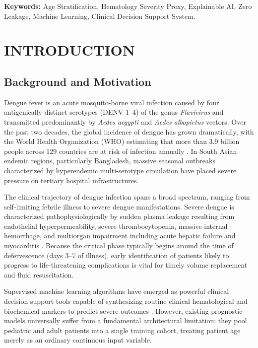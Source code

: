\documentclass[12pt, a4paper]{report}
\begin{document}
\vspace{0.8cm}
\noindent
\textbf{Keywords:} Age Stratification, Hematology Severity Proxy, Explainable AI, Zero Leakage, Machine Learning, Clinical Decision Support System.

\tableofcontents
\listoffigures
\listoftables

\clearpage
{}

\chapter{INTRODUCTION}

\section{Background and Motivation}
Dengue fever is an acute mosquito-borne viral infection caused by four antigenically distinct serotypes (DENV 1--4) of the genus \textit{Flavivirus} and transmitted predominantly by \textit{Aedes aegypti} and \textit{Aedes albopictus} vectors. Over the past two decades, the global incidence of dengue has grown dramatically, with the World Health Organization (WHO) estimating that more than 3.9 billion people across 129 countries are at risk of infection annually \cite{who2009, halstead2007}. In South Asian endemic regions, particularly Bangladesh, massive seasonal outbreaks characterized by hyperendemic multi-serotype circulation have placed severe pressure on tertiary hospital infrastructures.

The clinical trajectory of dengue infection spans a broad spectrum, ranging from self-limiting febrile illness to severe dengue manifestations. Severe dengue is characterized pathophysiologically by sudden plasma leakage resulting from endothelial hyperpermeability, severe thrombocytopenia, massive internal hemorrhage, and multiorgan impairment including acute hepatic failure and myocarditis \cite{who2009}. Because the critical phase typically begins around the time of defervescence (days 3--7 of illness), early identification of patients likely to progress to life-threatening complications is vital for timely volume replacement and fluid resuscitation.

Supervised machine learning algorithms have emerged as powerful clinical decision support tools capable of synthesizing routine clinical hematological and biochemical markers to predict severe outcomes \cite{chowdhury2022, masum2025, niazi2026}. However, existing prognostic models universally suffer from a fundamental architectural limitation: they pool pediatric and adult patients into a single training cohort, treating patient age merely as an ordinary continuous input variable.
\end{document}
